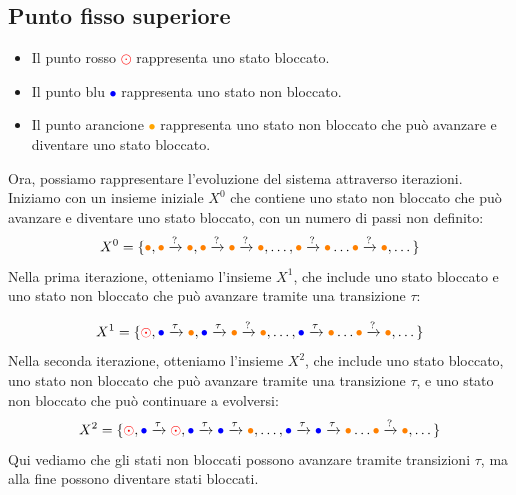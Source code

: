 \subsection{Punto fisso superiore}
\begin{itemize}
  \item Il punto rosso \textcolor{red}{$\odot$} rappresenta uno stato
  bloccato.
  \item Il punto blu \textcolor{blue}{$\bullet$} rappresenta uno stato
  non bloccato.
  \item Il punto arancione \textcolor{orange}{$\bullet$} rappresenta uno
  stato non bloccato che può avanzare e diventare uno stato bloccato.
\end{itemize}
Ora, possiamo rappresentare l'evoluzione del sistema attraverso
iterazioni. Iniziamo con un insieme iniziale $X^0$ che contiene
uno stato non bloccato che può avanzare e diventare uno stato bloccato, con un 
numero di passi non definito:
\[
  X^0 = \{ \textcolor{orange}{\bullet}, \textcolor{orange}{\bullet} \xrightarrow[]{?}\textcolor{orange}{\bullet},
  \textcolor{orange}{\bullet} \xrightarrow[]{?}\textcolor{orange}{\bullet}\xrightarrow[]{?}\textcolor{orange}{\bullet},
  \dots,
  \textcolor{orange}{\bullet} \xrightarrow[]{?}\textcolor{orange}{\bullet}
  \dots
  \textcolor{orange}{\bullet} \xrightarrow[]{?}\textcolor{orange}{\bullet}
  ,\dots\}
\]
Nella prima iterazione, otteniamo l'insieme $X^1$, che include uno stato
bloccato e uno stato non bloccato che può avanzare tramite una transizione
$\tau$:

\[
  X^1 = \{ \textcolor{red}{\odot}, \textcolor{blue}{\bullet} \xrightarrow[]{\tau}\textcolor{orange}{\bullet},
  \textcolor{blue}{\bullet} \xrightarrow[]{\tau}\textcolor{orange}{\bullet}\xrightarrow[]{?}\textcolor{orange}{\bullet},
  \dots,
  \textcolor{blue}{\bullet} \xrightarrow[]{\tau}\textcolor{orange}{\bullet}
  \dots
  \textcolor{orange}{\bullet} \xrightarrow[]{?}\textcolor{orange}{\bullet}
  ,\dots\}
\]
Nella seconda iterazione, otteniamo l'insieme $X^2$, che include uno
stato bloccato, uno stato non bloccato che può avanzare tramite una
transizione $\tau$, e uno stato non bloccato che può continuare a
evolversi:
\[
  X^2 = \{ \textcolor{red}{\odot}, \textcolor{blue}{\bullet} \xrightarrow[]{\tau}\textcolor{red}{\odot},
  \textcolor{blue}{\bullet} \xrightarrow[]{\tau}\textcolor{blue}{\bullet} \xrightarrow[]{\tau}\textcolor{orange}{\bullet},
  \dots,
  \textcolor{blue}{\bullet} \xrightarrow[]{\tau}\textcolor{blue}{\bullet} \xrightarrow[]{\tau}
  \textcolor{orange}{\bullet}
  \dots
  \textcolor{orange}{\bullet} \xrightarrow[]{?}\textcolor{orange}{\bullet}
  ,\dots\}
\]
Qui vediamo che gli stati non bloccati possono avanzare tramite transizioni $\tau$, ma alla fine possono diventare stati bloccati.

